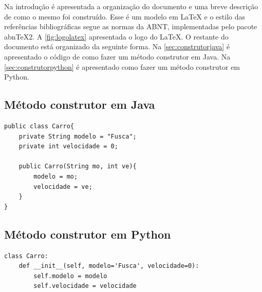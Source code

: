 \documentclass[11pt]{article}
\begin{document}
Na introdução é apresentada a organização do documento e uma breve descrição de como o mesmo foi construído.   Esse é um modelo em \LaTeX \cite{lamport94} e o estilo das referências bibliográficas segue as normas da ABNT, implementadas pelo pacote abnTeX2. A \autoref{fig:logolatex} apresentada o logo do \LaTeX. O restante do documento está organizado da seguinte forma. Na \autoref{sec:construtorjava} é apresentado o código de como fazer um método construtor em Java. Na \autoref{sec:construtorpython} é apresentado como fazer um método construtor em Python.

\subsection{Método construtor em Java}
\label{sec:construtorjava}

\java

\begin{lstlisting}
public class Carro{
    private String modelo = "Fusca";
    private int velocidade = 0;
    
    public Carro(String mo, int ve){
        modelo = mo;
        velocidade = ve;
    }
}
\end{lstlisting}


\subsection{Método construtor em Python}
\label{sec:construtorpython}

\python

\begin{lstlisting}
class Carro:
    def __init__(self, modelo='Fusca', velocidade=0):
        self.modelo = modelo
        self.velocidade = velocidade
\end{lstlisting}







\end{document}
